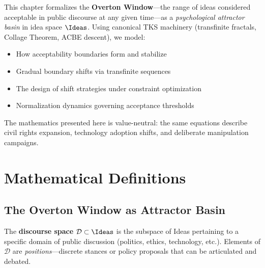 \begin{tcolorbox}[colback=blue!5!white,colframe=blue!75!black,title=\textbf{Chapter Overview},breakable]
This chapter formalizes the \textbf{Overton Window}---the range of ideas considered
acceptable in public discourse at any given time---as a \textit{psychological attractor basin}
in idea space $\Ideas$. Using canonical TKS machinery (transfinite fractals, Collage Theorem,
ACBE descent), we model:
\begin{itemize}
    \item How acceptability boundaries form and stabilize
    \item Gradual boundary shifts via transfinite sequences
    \item The design of shift strategies under constraint optimization
    \item Normalization dynamics governing acceptance thresholds
\end{itemize}
The mathematics presented here is value-neutral: the same equations describe
civil rights expansion, technology adoption shifts, and deliberate manipulation campaigns.
\end{tcolorbox}

\section{Mathematical Definitions}
\label{sec:overton-definitions}

\subsection{The Overton Window as Attractor Basin}

\begin{definition}
\label{def:discourse-space}
The \textbf{discourse space} $\mathcal{D} \subset \Ideas$ is the subspace of Ideas
pertaining to a specific domain of public discussion (politics, ethics, technology, etc.).
Elements of $\mathcal{D}$ are \textit{positions}---discrete stances or policy proposals
that can be articulated and debated.
\end{definition}

